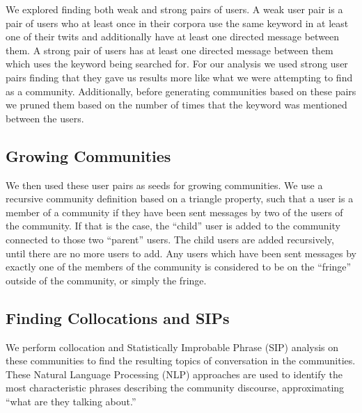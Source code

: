 We explored finding both weak and strong pairs of users.  A weak user pair is a pair of users who at least once in their corpora use the same keyword in at least one of their twits and additionally have at least one directed message between them.  A strong pair of users has at least one directed message between them which uses the keyword being searched for.  For our analysis we used strong user pairs finding that they gave us results more like what we were attempting to find as a community.  Additionally, before generating communities based on these pairs we pruned them based on the number of times that the keyword was mentioned between the users.

\subsection{Growing Communities}

We then used these user pairs as seeds for growing communities.  We use a recursive community definition based on a triangle property, such that a user is a member of a community if they have been sent messages by two of the users of the community.  If that is the case, the ``child'' user is added to the community connected to those two ``parent'' users. The child users are added recursively, until there are no more users to add.  Any users which have been sent messages by exactly one of the members of the community is considered to be on the ``fringe'' outside of the community, or simply the fringe.

\subsection{Finding Collocations and SIPs}

We perform collocation and Statistically Improbable Phrase (SIP) analysis on these communities to find the resulting topics of conversation in the communities.  These Natural Language Processing (NLP) approaches are used to identify the most characteristic phrases describing the community discourse, approximating ``what are they talking about.''
